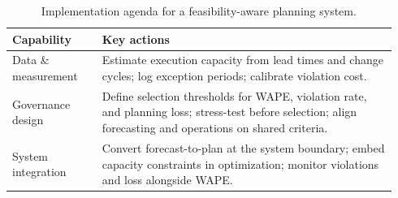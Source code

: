 \begin{table}[H]
\centering
\caption{Implementation agenda for a feasibility-aware planning system.}
\label{tab:implementation-agenda}
\small
\renewcommand{\arraystretch}{0.85}
\begin{tabular}{@{}p{0.22\linewidth}p{0.72\linewidth}@{}}
\toprule
\textbf{Capability} & \textbf{Key actions} \\
\midrule
Data \& measurement & Estimate execution capacity from lead times and change cycles; log exception periods; calibrate violation cost. \\
Governance design & Define selection thresholds for WAPE, violation rate, and planning loss; stress-test before selection; align forecasting and operations on shared criteria. \\
System integration & Convert forecast-to-plan at the system boundary; embed capacity constraints in optimization; monitor violations and loss alongside WAPE. \\
\bottomrule
\end{tabular}
\end{table}
